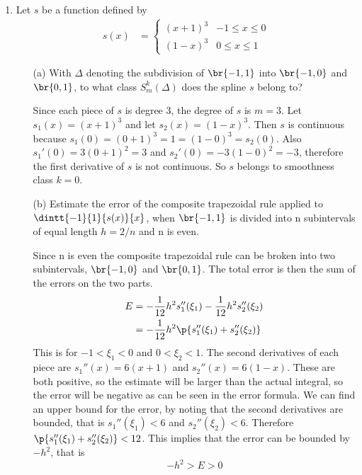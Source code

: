\documentclass[11pt]{article}
\begin{document}
\begin{enumerate}
    \item %
        Let $s$ be a function defined by
        \begin{align*}
            s(x) &=
            \begin{cases}
                (x + 1)^3 & -1 \le x \le 0 \\
                (1 - x)^3 & 0 \le x \le 1
            \end{cases}
        \end{align*}
        \begin{enumerate}
            \item[(a)] %
                With $\Delta$ denoting the subdivision of $\br{-1,1}$ into
                $\br{-1, 0}$ and $\br{0, 1}$, to what class $S_m^k(\Delta)$
                does the spline $s$ belong to?

                Since each piece of $s$ is degree 3, the degree of $s$ is $m = 3$.
                Let $s_1(x) = (x + 1)^3$ and let $s_2(x) = (1-x)^3$.
                Then $s$ is continuous because $s_1(0) = (0 + 1)^3 = 1 = (1 - 0)^3
                = s_2(0)$.
                Also $s_1'(0) = 3(0 + 1)^2 = 3$ and $s_2'(0) = -3(1 - 0)^2 = -3$,
                therefore the first derivative of $s$ is not continuous.
                So $s$ belongs to smoothness class $k=0$.

            \item[(b)] %
                Estimate the error of the composite trapezoidal rule applied to 
                $\dintt{-1}{1}{s(x)}{x}$, when $\br{-1, 1}$ is divided into n
                subintervals of equal length $h = 2/n$ and n is even.

                Since n is even the composite trapezoidal rule can be broken
                into two subintervals, $\br{-1,0}$ and $\br{0,1}$.
                The total error is then the sum of the errors on the two parts.
                \begin{align*}
                    E &= -\frac{1}{12}h^2 s_1''(\xi_1) - \frac{1}{12} h^2 s_2''(\xi_2) \\
                    &= -\frac{1}{12} h^2 \p{s_1''(\xi_1) + s_2''(\xi_2)}
                \end{align*}
                This is for $-1 < \xi_1 < 0$ and $0 < \xi_2 < 1$.
                The second derivatives of each piece are $s_1''(x) = 6(x + 1)$
                and $s_2''(x) = 6(1 - x)$.
                These are both positive, so the estimate will be larger than
                the actual integral, so the error will be negative as can be
                seen in the error formula.
                We can find an upper bound for the error, by noting that the
                second derivatives are bounded, that is $s_1''(\xi_1) < 6$
                and $s_2''(\xi_2) < 6$.
                Therefore $\p{s_1''(\xi_1) + s_2''(\xi_2)} < 12$.
                This implies that the error can be bounded by $-h^2$, that is
                \[
                     -h^2 > E > 0
                \]


\end{enumerate}
\end{enumerate}
\end{document}
